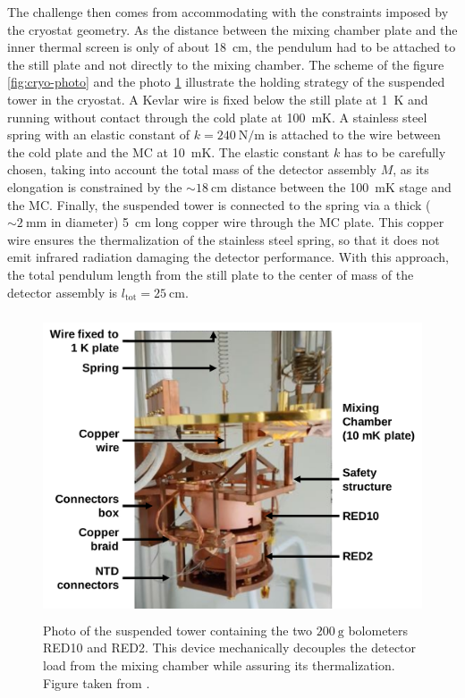 The challenge then comes from accommodating with the constraints imposed by the cryostat geometry. As the distance between the mixing chamber plate and the inner thermal screen is only of about \SI{18}{\cm}, the pendulum had to be attached to the still plate and not directly to the mixing chamber.
The scheme of the figure \ref{fig:cryo-photo} and the photo \ref{fig:suspended-tower} illustrate the holding strategy of the suspended tower in the cryostat. 
A Kevlar wire is fixed below the still plate at \SI{1}{\kelvin} and running without contact through the cold plate at \SI{100}{\milli\kelvin}. 
A stainless steel spring with an elastic constant of $k=\SI{240}{\newton\per\meter}$ is attached to the wire between the cold plate and the MC at \SI{10}{\milli\kelvin}. The elastic constant $k$ has to be carefully chosen, taking into account the total mass of the detector assembly $M$, as its elongation is constrained by the $\sim \SI{18}{\cm}$ distance between the \SI{100}{\milli\kelvin} stage and the MC. 
Finally, the suspended tower is connected to the spring via a thick ($\sim \SI{2}{\mm}$ in diameter) \SI{5}{\cm} long copper wire through the MC plate. This copper wire ensures the thermalization of the stainless steel spring, so that it does not emit infrared radiation damaging the detector performance.
With this approach, the total pendulum length from the still plate to the center of mass of the detector assembly is $l_{\textrm{tot}} = \SI{25}{\cm}$.


\begin{figure}
\centering
\includegraphics[height=9cm]{Figures/Experiment/damocles.png}
\caption{Photo of the suspended tower containing the two $\SI{200}{\g}$ bolometers RED10 and RED2. This device mechanically decouples the detector load from the mixing chamber while assuring its thermalization. Figure taken from \cite{Maisonobe:2018tbq}.}
\label{fig:suspended-tower} 
\end{figure}


